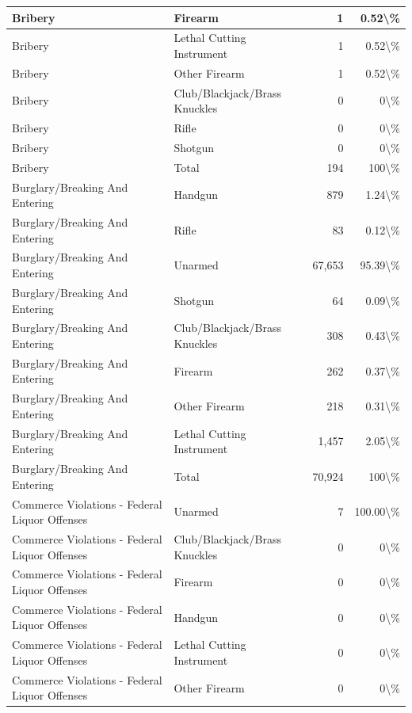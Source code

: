 \documentclass[
]{krantz}
\begin{document}
\begin{longtable}[t]{l|l|r|r}
\hline
Bribery & Firearm & 1 & 0.52\textbackslash{}\%\\
\hline
Bribery & Lethal Cutting Instrument & 1 & 0.52\textbackslash{}\%\\
\hline
Bribery & Other Firearm & 1 & 0.52\textbackslash{}\%\\
\hline
Bribery & Club/Blackjack/Brass Knuckles & 0 & 0\textbackslash{}\%\\
\hline
Bribery & Rifle & 0 & 0\textbackslash{}\%\\
\hline
Bribery & Shotgun & 0 & 0\textbackslash{}\%\\
\hline
Bribery & Total & 194 & 100\textbackslash{}\%\\
\hline
Burglary/Breaking And Entering & Handgun & 879 & 1.24\textbackslash{}\%\\
\hline
Burglary/Breaking And Entering & Rifle & 83 & 0.12\textbackslash{}\%\\
\hline
Burglary/Breaking And Entering & Unarmed & 67,653 & 95.39\textbackslash{}\%\\
\hline
Burglary/Breaking And Entering & Shotgun & 64 & 0.09\textbackslash{}\%\\
\hline
Burglary/Breaking And Entering & Club/Blackjack/Brass Knuckles & 308 & 0.43\textbackslash{}\%\\
\hline
Burglary/Breaking And Entering & Firearm & 262 & 0.37\textbackslash{}\%\\
\hline
Burglary/Breaking And Entering & Other Firearm & 218 & 0.31\textbackslash{}\%\\
\hline
Burglary/Breaking And Entering & Lethal Cutting Instrument & 1,457 & 2.05\textbackslash{}\%\\
\hline
Burglary/Breaking And Entering & Total & 70,924 & 100\textbackslash{}\%\\
\hline
Commerce Violations - Federal Liquor Offenses & Unarmed & 7 & 100.00\textbackslash{}\%\\
\hline
Commerce Violations - Federal Liquor Offenses & Club/Blackjack/Brass Knuckles & 0 & 0\textbackslash{}\%\\
\hline
Commerce Violations - Federal Liquor Offenses & Firearm & 0 & 0\textbackslash{}\%\\
\hline
Commerce Violations - Federal Liquor Offenses & Handgun & 0 & 0\textbackslash{}\%\\
\hline
Commerce Violations - Federal Liquor Offenses & Lethal Cutting Instrument & 0 & 0\textbackslash{}\%\\
\hline
Commerce Violations - Federal Liquor Offenses & Other Firearm & 0 & 0\textbackslash{}\%\\

\end{longtable}
\end{document}
